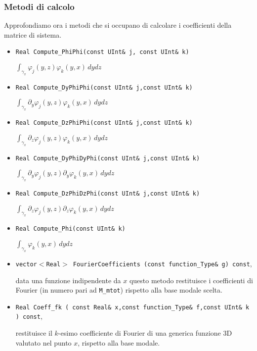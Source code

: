 \subsubsection{Metodi di calcolo}
Approfondiamo ora i metodi che si occupano di calcolare i coefficienti della matrice di sistema.

\begin{itemize}
\item \texttt{Real Compute\_PhiPhi(const UInt\& j, const UInt\& k)}

 $\int_{\gamma_x}\varphi_j(y,z)\varphi_k(y,x) \,dydz$

\item \texttt{Real Compute\_DyPhiPhi(const UInt\& j,const UInt\& k)} 

$\int_{\gamma_x} \partial_y \varphi_j(y,z)\varphi_k(y,x) \,dydz$

\item \texttt{Real Compute\_DzPhiPhi(const UInt\& j,const UInt\& k)} 

$\int_{\gamma_x} \partial_z \varphi_j(y,z)\varphi_k(y,x) \,dydz$

\item \texttt{Real Compute\_DyPhiDyPhi(const UInt\& j,const UInt\& k)} 

$\int_{\gamma_x} \partial_y \varphi_j(y,z)\partial_y\varphi_k(y,x) \,dydz$

\item \texttt{Real Compute\_DzPhiDzPhi(const UInt\& j,const UInt\& k)} 

$\int_{\gamma_x} \partial_z \varphi_j(y,z)\partial_z\varphi_k(y,x) \,dydz$

\item \texttt{Real Compute\_Phi(const UInt\& k)} 

$\int_{\gamma_x} \varphi_k(y,x) \,dydz$

\item \texttt{vector$<$Real$>$ FourierCoefficients (const function\_Type\& g) const},

data una funzione indipendente da $x$ questo metodo restituisce i coefficienti di Fourier (in numero pari ad \texttt{M\_mtot}) rispetto alla base modale scelta.

\item \texttt{Real Coeff\_fk (	const Real\& x,const function\_Type\& f,const UInt\& k ) const},

restituisce il $k$-esimo coefficiente di Fourier di una generica funzione 3D valutato nel punto $x$, rispetto alla base modale.
\end{itemize}


